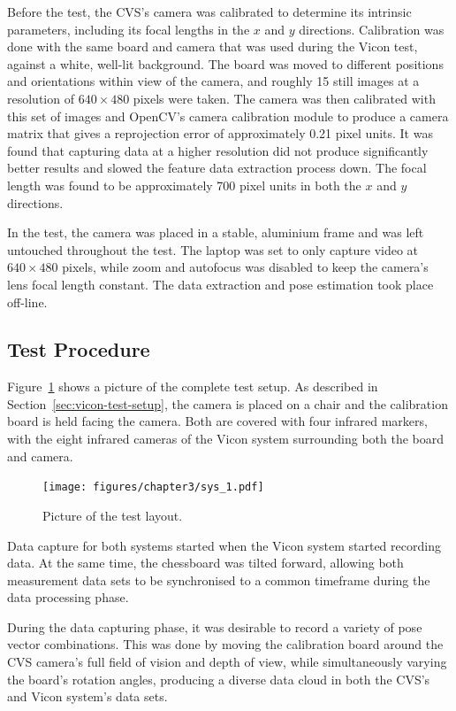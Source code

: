 Before the test, the CVS's camera was calibrated to determine its intrinsic parameters, including its focal lengths in the $x$ and $y$ directions. Calibration was done with the same board and camera that was used during the Vicon test, against a white, well-lit background. The board was moved to different positions and orientations within view of the camera, and roughly 15 still images at a resolution of $640\times480$ pixels were taken. The camera was then calibrated with this set of images and OpenCV's camera calibration module to produce a camera matrix that gives a reprojection error of approximately 0.21 pixel units. It was found that capturing data at a higher resolution did not produce significantly better results and slowed the feature data extraction process down. The focal length was found to be approximately 700 pixel units in both the $x$ and $y$ directions.

In the test, the camera was placed in a stable, aluminium frame and was left untouched throughout the test. The laptop was set to only capture video at $640\times480$ pixels, while zoom and autofocus was disabled to keep the camera's lens focal length constant. The data extraction and pose estimation took place off-line. 

\subsection{Test Procedure}

Figure~\ref{fig:chap3-pic-sys-layout} shows a picture of the complete test setup. As described in Section~\ref{sec:vicon-test-setup}, the camera is placed on a chair and the calibration board is held facing the camera. Both are covered with four infrared markers, with the eight infrared cameras of the Vicon system surrounding both the board and camera.  

\begin{figure}
  \centering
  \texttt{[image: figures/chapter3/sys\_1.pdf]}
  \caption{Picture of the test layout.}
\label{fig:chap3-pic-sys-layout}
\end{figure}

Data capture for both systems started when the Vicon system started recording data. At the same time, the chessboard was tilted forward, allowing both measurement data sets to be synchronised to a common timeframe during the data processing phase. 

During the data capturing phase, it was desirable to record a variety of pose vector combinations. This was done by moving the calibration board around the CVS camera's full field of vision and depth of view, while simultaneously varying the board's rotation angles, producing a diverse data cloud in both the CVS's and Vicon system's data sets. 

